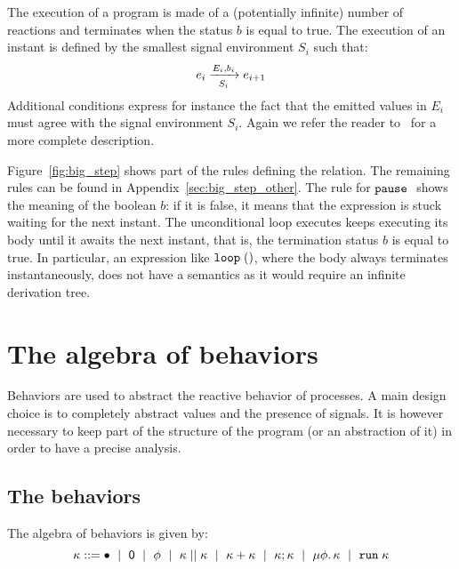 \documentclass[9pt,preprint]{sigplanconf}
\newcommand{\sdeq}{::=}
\begin{document}
The execution of a program is made of a (potentially infinite) number of reactions and terminates when the status $b$ is equal to true. The execution of an instant is defined by the smallest signal environment $S_i$ such that:
\[ \bigstep{N}{e_i}{e_{i+1}}{E_i}{b_i}{S_i} \]
Additional conditions express for instance the fact that the emitted values in $E_i$ must agree with the signal environment $S_i$. Again we refer the reader to~\cite{Mandel:2005} for a more complete description.



Figure~\ref{fig:big_step} shows part of the rules defining the relation. The remaining rules can be found in Appendix~\ref{sec:big_step_other}. The rule for $\epause{}$ shows the meaning of the boolean $b$: if it is false, it means that the expression is stuck waiting for the next instant. The unconditional loop executes keeps executing its body until it awaits the next instant, that is, the termination status $b$ is equal to true. In particular, an expression like $\eloop{\evoid{}}$, where the body always terminates instantaneously, does not have a semantics as it would require an infinite derivation tree.

\begin{figure*}
\begin{small}

\end{small}


\caption{Big-step semantics}
\label{fig:big_step}
\end{figure*}

\section{The algebra of behaviors}
\label{sec:behaviors}


Behaviors are used to abstract the reactive behavior of processes. A main design choice is to completely abstract values and the presence of signals. It is however necessary to keep part of the structure of the program (or an abstraction of it) in order to have a precise analysis.

\subsection{The behaviors}

The algebra of behaviors is given by:
\[
\rk \sdeq \effplus ~\mid~ \effmin ~\mid~ \effvar ~\mid~ \effpar{\rk}{\rk} ~\mid~ \effor{\rk}{\rk}
~\mid~ \effcon{\rk}{\rk}  ~\mid~ \effrec{\effvar}{\rk}  ~\mid~ \effrun{\rk}
\]
\end{document}
